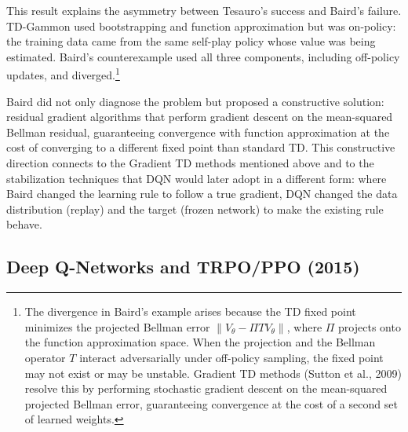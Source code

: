 This result explains the asymmetry between Tesauro's success and Baird's failure. TD-Gammon used bootstrapping and function approximation but was on-policy: the training data came from the same self-play policy whose value was being estimated. Baird's counterexample used all three components, including off-policy updates, and diverged.\footnote{The divergence in Baird's example arises because the TD fixed point minimizes the projected Bellman error $\|V_\theta - \Pi T V_\theta\|$, where $\Pi$ projects onto the function approximation space. When the projection and the Bellman operator $T$ interact adversarially under off-policy sampling, the fixed point may not exist or may be unstable. Gradient TD methods (Sutton et al., 2009) resolve this by performing stochastic gradient descent on the mean-squared projected Bellman error, guaranteeing convergence at the cost of a second set of learned weights.}

Baird did not only diagnose the problem but proposed a constructive solution: residual gradient algorithms that perform gradient descent on the mean-squared Bellman residual, guaranteeing convergence with function approximation at the cost of converging to a different fixed point than standard TD. This constructive direction connects to the Gradient TD methods mentioned above and to the stabilization techniques that DQN would later adopt in a different form: where Baird changed the learning rule to follow a true gradient, DQN changed the data distribution (replay) and the target (frozen network) to make the existing rule behave.

\subsection{Deep Q-Networks and TRPO/PPO (2015)}

